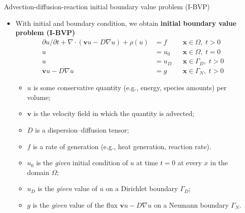 %
%
\begin{frame}{Advection-diffusion-reaction initial boundary value problem (I-BVP)}

\begin{itemize}
\item With initial and boundary condition, 
we obtain \alert{\bf initial boundary value problem (I-BVP)}
%
\begin{align*}
\partial u/\partial t+\nabla\cdot(\boldsymbol{v}u-D\nabla u)  + \rho (u) & =f &  & \boldsymbol{x}\in\Omega,\;t>0\\
u & =u_{0} &  & \boldsymbol{x}\in\Omega,\;t=0\\
u & =u_{D} &  & \boldsymbol{x}\in\Gamma_{D},\;t>0\\
\boldsymbol{v}u-D\nabla u & =g &  & \boldsymbol{x}\in\Gamma_{N},\;t>0
\end{align*}
%
\vskip -5pt
\begin{itemize}
\item $u$ is some \alert{conservative quantity} (e.g., energy, species
amounts) per volume;
\item $\boldsymbol{v}$ is the \alert{velocity field} in which the quantity is advected;
\item $D$ is a \alert{dispersion–diffusion tensor}; 
\item $f$ is a \alert{rate of generation} (e.g., heat generation, reaction
rate).
\item $u_{0}$ is the \emph{given} \alert{initial condition} of $u$ at
time $t=0$ at every $x$ in the domain $\Omega$;
\item $u_{D}$ is the \emph{given} value of $u$ on a \alert{Dirichlet boundary}
$\Gamma_{D}$;
\item $g$ is the \emph{given} value of the flux $\boldsymbol{v}u-D\nabla u$
on a \alert{Neumann boundary} $\Gamma_{N}$.
\end{itemize}
\end{itemize}

\end{frame}
%
